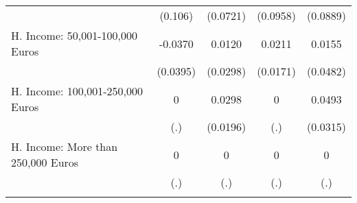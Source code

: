 {\begin{tabular}{l*{4}{c}}
            &     (0.106)         &    (0.0721)         &    (0.0958)         &    (0.0889)         \\
[1em]
H. Income: 50,001-100,000 Euros&     -0.0370         &      0.0120         &      0.0211         &      0.0155         \\
            &    (0.0395)         &    (0.0298)         &    (0.0171)         &    (0.0482)         \\
[1em]
H. Income: 100,001-250,000 Euros&           0         &      0.0298         &           0         &      0.0493         \\
            &         (.)         &    (0.0196)         &         (.)         &    (0.0315)         \\
[1em]
H. Income: More than 250,000 Euros&           0         &           0         &           0         &           0         \\
            &         (.)         &         (.)         &         (.)         &         (.)         \\
\hline\hline
{}\\
\end{tabular}
}
